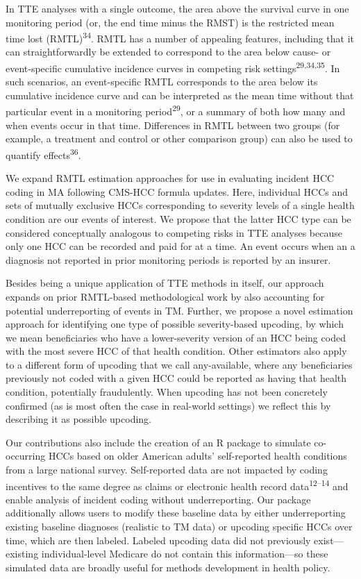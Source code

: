 \documentclass[
  12pt,
  number]{elsarticle}
\begin{document}
In TTE analyses with a single outcome, the area above the survival curve
in one monitoring period (or, the end time minus the RMST) is the
restricted mean time lost (RMTL)\textsuperscript{34}. RMTL has a number
of appealing features, including that it can straightforwardly be
extended to correspond to the area below cause- or event-specific
cumulative incidence curves in competing risk
settings\textsuperscript{29,34,35}. In such scenarios, an event-specific
RMTL corresponds to the area below its cumulative incidence curve and
can be interpreted as the mean time without that particular event in a
monitoring period\textsuperscript{29}, or a summary of both how many and
when events occur in that time. Differences in RMTL between two groups
(for example, a treatment and control or other comparison group) can
also be used to quantify effects\textsuperscript{36}.

We expand RMTL estimation approaches for use in evaluating incident HCC
coding in MA following CMS-HCC formula updates. Here, individual HCCs
and sets of mutually exclusive HCCs corresponding to severity levels of
a single health condition are our events of interest. We propose that
the latter HCC type can be considered conceptually analogous to
competing risks in TTE analyses because only one HCC can be recorded and
paid for at a time. An event occurs when an a diagnosis not reported in
prior monitoring periods is reported by an insurer.

Besides being a unique application of TTE methods in itself, our
approach expands on prior RMTL-based methodological work by also
accounting for potential underreporting of events in TM. Further, we
propose a novel estimation approach for identifying one type of possible
severity-based upcoding, by which we mean beneficiaries who have a
lower-severity version of an HCC being coded with the most severe HCC of
that health condition. Other estimators also apply to a different form
of upcoding that we call any-available, where any beneficiaries
previously not coded with a given HCC could be reported as having that
health condition, potentially fraudulently. When upcoding has not been
concretely confirmed (as is most often the case in real-world settings)
we reflect this by describing it as possible upcoding.

Our contributions also include the creation of an R package to simulate
co-occurring HCCs based on older American adults' self-reported health
conditions from a large national survey. Self-reported data are not
impacted by coding incentives to the same degree as claims or electronic
health record data\textsuperscript{12--14} and enable analysis of
incident coding without underreporting. Our package additionally allows
users to modify these baseline data by either underreporting existing
baseline diagnoses (realistic to TM data) or upcoding specific HCCs over
time, which are then labeled. Labeled upcoding data did not previously
exist---existing individual-level Medicare do not contain this
information---so these simulated data are broadly useful for methods
development in health policy.
\end{document}

